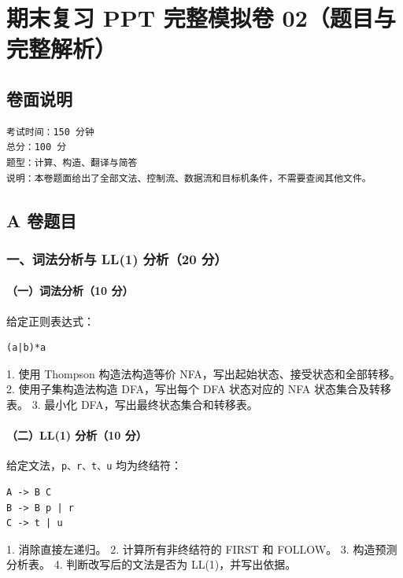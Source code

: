 \documentclass[UTF8]{ctexart}
\begin{document}
\section*{期末复习 PPT 完整模拟卷 02（题目与完整解析）}

\subsection*{卷面说明}

\begin{Verbatim}[fontsize=\small,breaklines=true]
考试时间：150 分钟
总分：100 分
题型：计算、构造、翻译与简答
说明：本卷题面给出了全部文法、控制流、数据流和目标机条件，不需要查阅其他文件。
\end{Verbatim}

\subsection*{A 卷题目}

\subsubsection*{一、词法分析与 LL(1) 分析（20 分）}

\paragraph*{（一）词法分析（10 分）}

给定正则表达式：

\begin{Verbatim}[fontsize=\small,breaklines=true]
(a|b)*a
\end{Verbatim}

1. 使用 Thompson 构造法构造等价 NFA，写出起始状态、接受状态和全部转移。 2. 使用子集构造法构造 DFA，写出每个 DFA 状态对应的 NFA 状态集合及转移表。 3. 最小化 DFA，写出最终状态集合和转移表。

\paragraph*{（二）LL(1) 分析（10 分）}

给定文法，\texttt{p、r、t、u} 均为终结符：

\begin{Verbatim}[fontsize=\small,breaklines=true]
A -> B C
B -> B p | r
C -> t | u
\end{Verbatim}

1. 消除直接左递归。 2. 计算所有非终结符的 FIRST 和 FOLLOW。 3. 构造预测分析表。 4. 判断改写后的文法是否为 LL(1)，并写出依据。
\end{document}

